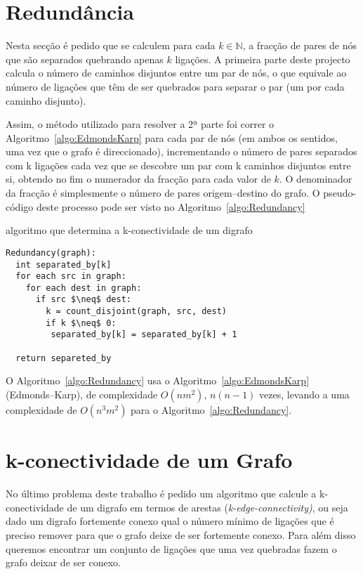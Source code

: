 \documentclass[10pt,a4paper]{article}
\begin{document}
\section{Redundância}
Nesta secção é pedido que se calculem para cada $k \in \mathbb{N} $, a fracção de pares de nós que são separados quebrando apenas $k$ ligações. A primeira parte deste projecto calcula o número de caminhos disjuntos entre um par de nós, o que equivale ao número de ligações que têm de ser quebrados para separar o par (um por cada caminho disjunto). 

Assim, o método utilizado para resolver a 2ª parte foi correr o Algoritmo~\ref{algo:EdmondsKarp} para cada par de nós (em ambos os sentidos, uma vez que o grafo é direccionado), incrementando o número de pares separados com k ligações cada vez que se descobre um par com k caminhos disjuntos entre si, obtendo no fim o numerador da fracção para cada valor de $k$. O denominador da fracção é simplesmente o número de pares origem--destino do grafo. O pseudo-código deste processo pode ser visto no Algoritmo~\ref{algo:Redundancy} 

\begin{algorithm}[h]
\caption{algoritmo que determina a k-conectividade de um digrafo}
\label{algo:Redundancy}
\begin{lstlisting}[linewidth=0.95\linewidth, mathescape]
Redundancy(graph):
  int separated_by[k]
  for each src in graph:
    for each dest in graph:
      if src $\neq$ dest:
        k = count_disjoint(graph, src, dest)
        if k $\neq$ 0:
         separated_by[k] = separated_by[k] + 1 

  return separeted_by
\end{lstlisting}
\end{algorithm}

O Algoritmo~\ref{algo:Redundancy} usa o Algoritmo~\ref{algo:EdmondsKarp} (Edmonds--Karp), de complexidade $O(n m^2)$, $n(n-1)$ vezes, levando a uma complexidade de $O(n^3 m^2)$ para o Algoritmo~\ref{algo:Redundancy}.

\section{k-conectividade de um Grafo}
No último problema deste trabalho é pedido um algoritmo que calcule a k-conectividade de um digrafo em termos de arestas (\textit{k-edge-connectivity)}, ou seja dado um digrafo fortemente conexo qual o número mínimo de ligações que é preciso remover para que o grafo deixe de ser fortemente conexo. Para além disso queremos encontrar um conjunto de ligações que uma vez quebradas fazem o grafo deixar de ser conexo.
\end{document}

